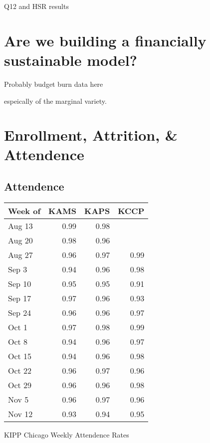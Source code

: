 \documentclass[sfsidenotes, justified]{tufte-handout}\usepackage{graphicx, color}
\begin{document}
Q12 and HSR results 

\section{Are we building a financially sustainable model?}

Probably budget burn data here

 espeically of the marginal variety. 
\blindtext
\blindtext

\blindtext
\blindtext
\section{Enrollment, Attrition, \& Attendence}
\subsection{Attendence} 









\begin{margintable}

{\small
\begin{tabular}{lrrr}
  \hline
Week of & KAMS & KAPS & KCCP \\ 
  \hline
Aug 13 & 0.99 & 0.98 &  \\ 
  Aug 20 & 0.98 & 0.96 &  \\ 
  Aug 27 & 0.96 & 0.97 & 0.99 \\ 
  Sep 3 & 0.94 & 0.96 & 0.98 \\ 
  Sep 10 & 0.95 & 0.95 & 0.91 \\ 
  Sep 17 & 0.97 & 0.96 & 0.93 \\ 
  Sep 24 & 0.96 & 0.96 & 0.97 \\ 
  Oct 1 & 0.97 & 0.98 & 0.99 \\ 
  Oct 8 & 0.94 & 0.96 & 0.97 \\ 
  Oct 15 & 0.94 & 0.96 & 0.98 \\ 
  Oct 22 & 0.96 & 0.97 & 0.96 \\ 
  Oct 29 & 0.96 & 0.96 & 0.98 \\ 
  Nov 5 & 0.96 & 0.97 & 0.96 \\ 
  Nov 12 & 0.93 & 0.94 & 0.95 \\ 
   \hline
\end{tabular}
}



\caption{KIPP Chicago Weekly Attendence Rates}
\end{margintable}
\end{document}
